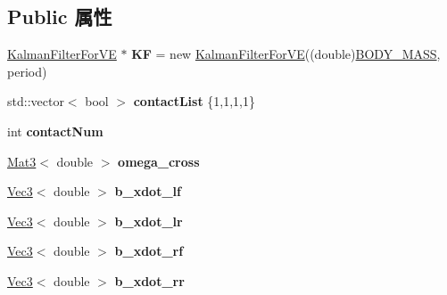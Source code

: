 \subsection*{Public 属性}
\begin{DoxyCompactItemize}
\item 
\mbox{\label{classVelocityEstimate_afbfcd77847cc98a3cbdb4f69786ffb20}} 
\hyperlink{classKalmanFilterForVE}{Kalman\+Filter\+For\+VE} $\ast$ {\bfseries KF} = new \hyperlink{classKalmanFilterForVE}{Kalman\+Filter\+For\+VE}((double)\hyperlink{commonFunction_8hpp_aac50eea90996008b81c25dc35d1eccc9}{B\+O\+D\+Y\+\_\+\+M\+A\+SS}, period)
\item 
\mbox{\label{classVelocityEstimate_aecd7df74067d2bd4d61609ed2910c858}} 
std\+::vector$<$ bool $>$ {\bfseries contact\+List} \{1,1,1,1\}
\item 
\mbox{\label{classVelocityEstimate_ab5235f1f44426893cf56a98bcf7de97b}} 
int {\bfseries contact\+Num}
\item 
\mbox{\label{classVelocityEstimate_a202d7f13b956a6389afcb0d38e628f7d}} 
\hyperlink{cppTypes_8h_adb7d462b35d31f0b2583b3e230a2a2c3}{Mat3}$<$ double $>$ {\bfseries omega\+\_\+cross}
\item 
\mbox{\label{classVelocityEstimate_ab4544a95b8be0ffd904fd3e9091b755d}} 
\hyperlink{cppTypes_8h_a65c27bf97693676535dd0b30ea0ad399}{Vec3}$<$ double $>$ {\bfseries b\+\_\+xdot\+\_\+lf}
\item 
\mbox{\label{classVelocityEstimate_a4da22b4e1bf4bc267033d42f0ba442cc}} 
\hyperlink{cppTypes_8h_a65c27bf97693676535dd0b30ea0ad399}{Vec3}$<$ double $>$ {\bfseries b\+\_\+xdot\+\_\+lr}
\item 
\mbox{\label{classVelocityEstimate_a7d1c7e2e308be18b282334994c985c93}} 
\hyperlink{cppTypes_8h_a65c27bf97693676535dd0b30ea0ad399}{Vec3}$<$ double $>$ {\bfseries b\+\_\+xdot\+\_\+rf}
\item 
\mbox{\label{classVelocityEstimate_a84739a2f10f1962f489476ac5483c733}} 
\hyperlink{cppTypes_8h_a65c27bf97693676535dd0b30ea0ad399}{Vec3}$<$ double $>$ {\bfseries b\+\_\+xdot\+\_\+rr}

\end{DoxyCompactItemize}
